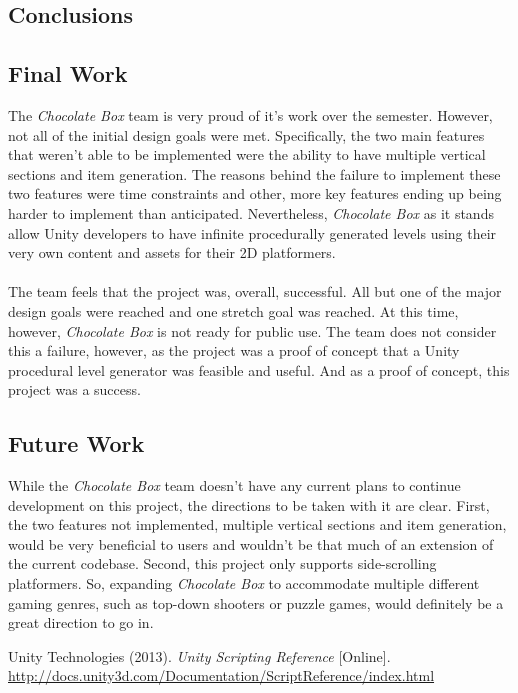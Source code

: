 \documentclass[pdftex,12pt,letter]{article}
\begin{document}
\begin{itemize}
\begin{itemize}
\begin{itemize}
\begin{itemize}
\section{Conclusions}
\subsection{Final Work}
The \textit{Chocolate Box} team is very proud of it's work over the semester. However, not all of the initial design goals were met. Specifically, the two main features that weren't able to be implemented were the ability to have multiple vertical sections and item generation. The reasons behind the failure to implement these two features were time constraints and other, more key features ending up being harder to implement than anticipated. Nevertheless, \textit{Chocolate Box} as it stands allow Unity developers to have infinite procedurally generated levels using their very own content and assets for their 2D platformers.\\\\
The team feels that the project was, overall, successful. All but one of the major design goals were reached and one stretch goal was reached. At this time, however, \textit{Chocolate Box} is not ready for public use. The team does not consider this a failure, however, as the project was a proof of concept that a Unity procedural level generator was feasible and useful. And as a proof of concept, this project was a success.

\subsection{Future Work}
While the \textit{Chocolate Box} team doesn't have any current plans to continue development on this project, the directions to be taken with it are clear. First, the two features not implemented, multiple vertical sections and item generation, would be very beneficial to users and wouldn't be that much of an extension of the current codebase. Second, this project only supports side-scrolling platformers. So, expanding \textit{Chocolate Box} to accommodate multiple different gaming genres, such as top-down shooters or puzzle games, would definitely be a great direction to go in. 
\begin{thebibliography}{3}
Unity Technologies (2013). \textit{Unity Scripting Reference} [Online]. \url{http://docs.unity3d.com/Documentation/ScriptReference/index.html}
\end{thebibliography}


\end{itemize}
\end{itemize}
\end{itemize}
\end{itemize}
\end{document}
